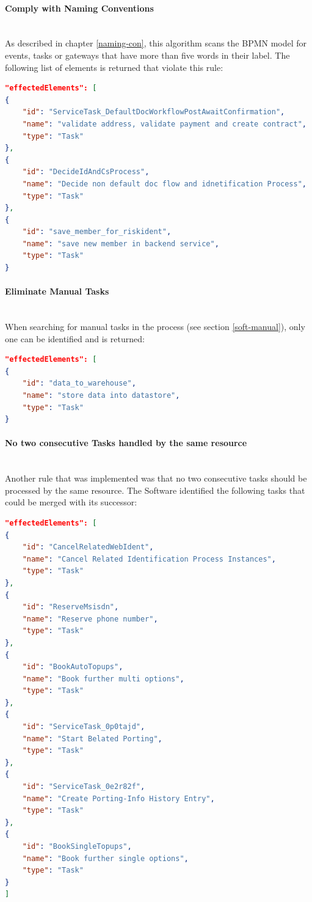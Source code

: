\paragraph{Comply with Naming Conventions}~\\
As described in chapter \ref{naming-con}, this algorithm scans the BPMN model for events, tasks or gateways that have more than five words in their label. The following list of elements is returned that violate this rule:
\begin{lstlisting}[language=json,label=lst:naming]
"effectedElements": [
{
	"id": "ServiceTask_DefaultDocWorkflowPostAwaitConfirmation",
	"name": "validate address, validate payment and create contract",
	"type": "Task"
},
{
	"id": "DecideIdAndCsProcess",
	"name": "Decide non default doc flow and idnetification Process",
	"type": "Task"
},
{
	"id": "save_member_for_riskident",
	"name": "save new member in backend service",
	"type": "Task"
}
\end{lstlisting}


\paragraph{Eliminate Manual Tasks}~\\
When searching for manual tasks in the process (see section \ref{soft-manual}), only one can be identified and is returned:
\begin{lstlisting}[language=json,label=lst:manual]
"effectedElements": [
{
	"id": "data_to_warehouse",
	"name": "store data into datastore",
	"type": "Task"
}
\end{lstlisting}
\paragraph{No two consecutive Tasks handled by the same resource}~\\
Another rule that was implemented was that no two consecutive tasks should be processed by the same resource. The Software identified the following tasks that could be merged with its successor:
\begin{lstlisting}[language=json,label=lst:merge]
"effectedElements": [
{
	"id": "CancelRelatedWebIdent",
	"name": "Cancel Related Identification Process Instances",
	"type": "Task"
},
{
	"id": "ReserveMsisdn",
	"name": "Reserve phone number",
	"type": "Task"
},
{
	"id": "BookAutoTopups",
	"name": "Book further multi options",
	"type": "Task"
},
{
	"id": "ServiceTask_0p0tajd",
	"name": "Start Belated Porting",
	"type": "Task"
},
{
	"id": "ServiceTask_0e2r82f",
	"name": "Create Porting-Info History Entry",
	"type": "Task"
},
{
	"id": "BookSingleTopups",
	"name": "Book further single options",
	"type": "Task"
}
]
\end{lstlisting}
